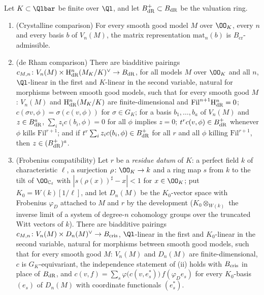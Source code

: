 \begin{theorem}\label{pf:steps1:cst}
Let $K\subset\Qlbar$ be finite over $\Ql$, and let $B_{\mathrm{dR}}^+\subset B_{\mathrm{dR}}$ be the valuation ring.
\begin{enumerate}[label=\textup{(\roman*)},nosep]
\item \textup{(Crystalline comparison)} For every smooth good model $M$ over $\OO_K$, every $n$ and every basis $b$ of
  $V_n(M)$, the matrix representation $\mathrm{mat}_n(b)$ is $B_{\mathrm{cr}}$-admissible.
\item \textup{(de Rham comparison)} There are biadditive pairings $c_{M,n}\colon V_n(M)\times\mathrm{H}^n_{\mathrm{dR}}(M_K/K)^\vee
  \to B_{\mathrm{dR}}$, for all models $M$ over $\OO_K$ and all $n$, $\Ql$-linear in the first and $K$-linear in the second
  variable, natural for morphisms between smooth good models, such that for every smooth good $M$: $V_n(M)$ and
  $\mathrm{H}^n_{\mathrm{dR}}(M_K/K)$ are finite-dimensional and $\mathrm{Fil}^{n+1}\mathrm{H}^n_{\mathrm{dR}}=0$;
  $c(\sigma v,\phi)=\sigma(c(v,\phi))$ for $\sigma\in G_K$; for a basis $b_1,\dots,b_a$ of $V_n(M)$ and $z\in B_{\mathrm{dR}}^a$,
  $\sum_iz_ic(b_i,\phi)=0$ for all $\phi$ implies $z=0$; $t^rc(v,\phi)\in B_{\mathrm{dR}}^+$ whenever $\phi$ kills
  $\mathrm{Fil}^{r+1}$; and if $t^r\sum_iz_ic(b_i,\phi)\in B_{\mathrm{dR}}^+$ for all $r$ and all $\phi$ killing
  $\mathrm{Fil}^{r+1}$, then $z\in(B_{\mathrm{dR}}^+)^a$.
\item \textup{(Frobenius compatibility)} Let $r$ be a \emph{residue datum} of $K$: a perfect field $k$ of characteristic
  $\ell$, a surjection $\rho\colon\OO_K\to k$ and a ring map $s$ from $k$ to the tilt of $\OO_{\stepsICl}$ with
  $|s(\rho(x))^\sharp-x|<1$ for $x\in\OO_K$; put $K_0=W(k)[1/\ell]$, and let $D_n(M)$ be the $K_0$-vector space with
  Frobenius $\varphi_D$ attached to $M$ and $r$ by the development ($K_0\otimes_{W(k)}$ the inverse limit of a system of
  degree-$n$ cohomology groups over the truncated Witt vectors of $k$). There are biadditive pairings
  $c_{M,n}\colon V_n(M)\times D_n(M)^\vee\to B_{\mathrm{cris}}$, $\Ql$-linear in the first and $K_0$-linear in the second variable,
  natural for morphisms between smooth good models, such that for every smooth good $M$: $V_n(M)$ and $D_n(M)$ are
  finite-dimensional, $c$ is $G_K$-equivariant, the independence statement of \textup{(ii)} holds with $B_{\mathrm{cris}}$ in
  place of $B_{\mathrm{dR}}$, and $c(v,f)=\sum_s\varphi\bigl(c(v,e_s^*)\bigr)\,f(\varphi_De_s)$ for every $K_0$-basis $(e_s)$ of
  $D_n(M)$ with coordinate functionals $(e_s^*)$.
\end{enumerate}
\end{theorem}

